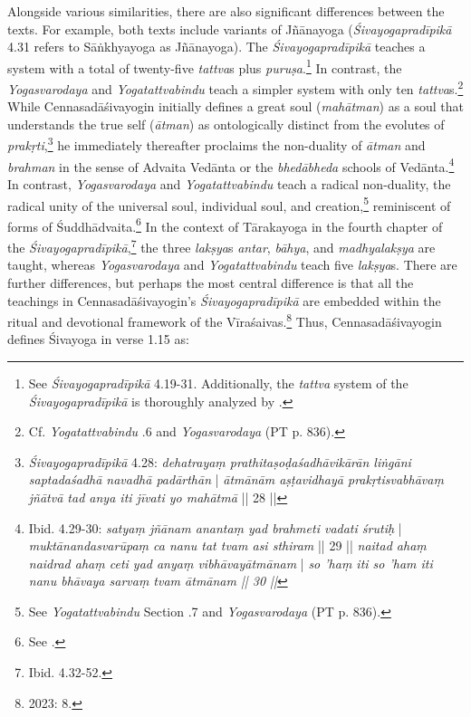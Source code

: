 Alongside various similarities, there are also significant differences between the texts. For example, both texts include variants of Jñānayoga (\textit{Śivayogapradīpikā} 4.31 refers to Sāṅkhyayoga as Jñānayoga). The \textit{Śivayogapradīpikā} teaches a system with a total of twenty-five \textit{tattva}s plus \textit{puruṣa}.\footnote{See \textit{Śivayogapradīpikā} 4.19-31. Additionally, the \textit{tattva} system of the \textit{Śivayogapradīpikā} is thoroughly analyzed by \citeauthor[2023: 239-242]{powell2023}.} In contrast, the \textit{Yogasvarodaya} and \textit{Yogatattvabindu} teach a simpler system with only ten \textit{tattva}s.\footnote{Cf. \textit{Yogatattvabindu} .6 and \textit{Yogasvarodaya} (PT p. 836).} While Cennasadāśivayogin initially defines a great soul (\textit{mahātman}) as a soul that understands the true self (\textit{ātman}) as ontologically distinct from the evolutes of \textit{prakṛti},\footnote{\textit{Śivayogapradīpikā} 4.28: \textit{dehatrayaṃ prathitaṣoḍaśadhāvikārān liṅgāni saptadaśadhā navadhā padārthān} | \textit{ātmānām aṣṭavidhayā prakṛtisvabhāvaṃ jñātvā tad anya iti jīvati yo mahātmā} || 28 ||} he immediately thereafter proclaims the non-duality of \textit{ātman} and \textit{brahman} in the sense of Advaita Vedānta or the \textit{bhedābheda} schools of Vedānta.\footnote{Ibid. 4.29-30: \textit{satyaṃ jñānam anantaṃ yad brahmeti vadati śrutiḥ} | \textit{muktānandasvarūpaṃ ca nanu tat tvam asi sthiram} || 29 || \textit{naitad ahaṃ naidrad ahaṃ ceti yad anyaṃ vibhāvayātmānam} | \textit{so 'haṃ iti so 'ham iti nanu bhāvaya sarvaṃ tvam ātmānam || 30 ||}} In contrast, \textit{Yogasvarodaya} and \textit{Yogatattvabindu} teach a radical non-duality, the radical unity of the universal soul, individual soul, and creation,\footnote{See \textit{Yogatattvabindu} Section .7 and \textit{Yogasvarodaya} (PT p. 836).} reminiscent of forms of Śuddhādvaita.\footnote{See \citeauthor[1985: 270–272]{glasenapp1949philosophie}.}
In the context of Tārakayoga in the fourth chapter of the \textit{Śivayogapradīpikā},\footnote{Ibid. 4.32-52.} the three \textit{lakṣya}s \textit{antar}, \textit{bāhya}, and \textit{madhyalakṣya} are taught, whereas \textit{Yogasvarodaya} and \textit{Yogatattvabindu} teach five \textit{lakṣya}s.
There are further differences, but perhaps the most central difference is that all the teachings in Cennasadāśivayogin's \textit{Śivayogapradīpikā} are embedded within the ritual and devotional framework of the Vīraśaivas.\footnote{\citeauthor{powell2023} 2023: 8.} Thus, Cennasadāśivayogin defines Śivayoga in verse 1.15 as:
